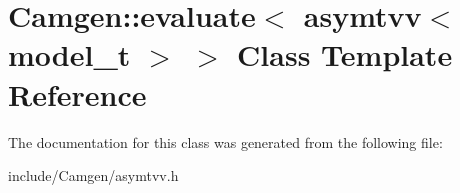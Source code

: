 \hypertarget{a00142}{}\section{Camgen\+:\+:evaluate$<$ asymtvv$<$ model\+\_\+t $>$ $>$ Class Template Reference}
\label{a00142}


The documentation for this class was generated from the following file\+:\begin{DoxyCompactItemize}
\item 
include/\+Camgen/asymtvv.\+h\end{DoxyCompactItemize}
